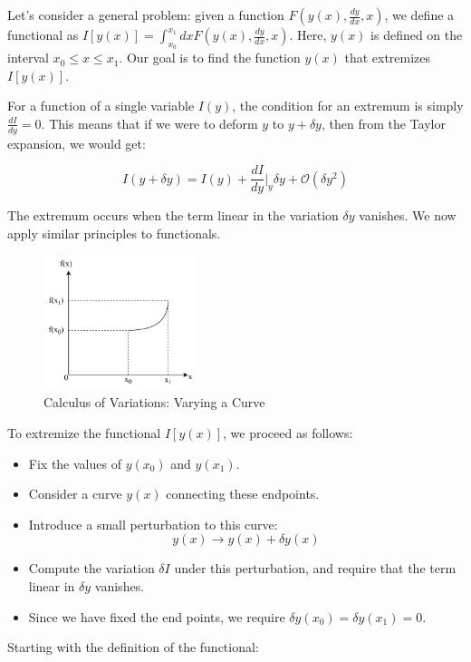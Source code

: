 Let's consider a general problem: given a function $F(y(x), \frac{dy}{dx}, x)$, we define 
a functional as $I[y(x)]=\int_{x_{0}}^{x_{1}} dx F(y(x), \frac{dy}{dx}, x)$. Here, $y(x)$ 
is defined on the interval $x_0 \leq x \leq x_1$. Our goal is to find the function $y(x)$ 
that extremizes $I[y(x)]$.

For a function of a single variable $I(y)$, the condition for an extremum is simply 
$\frac{dI}{dy} = 0$. This means that if we were to deform $y$ to $y + \delta y$, then 
from the Taylor expansion, we would get:

\[
    I(y + \delta y) = I(y) + \frac{dI}{dy}\bigg|_y \delta y + \mathcal{O}(\delta y^2)
\]

The extremum occurs when the term linear in the variation $\delta y$ vanishes. We now 
apply similar principles to functionals.

\begin{figure}[ht]
    \centering
    \includegraphics[width=0.4\textwidth]{images/3-1-1.png}
    \caption{Calculus of Variations: Varying a Curve}
    \label{fig:3-1-1}
\end{figure}

To extremize the functional $I[y(x)]$, we proceed as follows:

\begin{itemize}
    \item Fix the values of $y(x_0)$ and $y(x_1)$.
    \item Consider a curve $y(x)$ connecting these endpoints.
    \item Introduce a small perturbation to this curve:
    \[
        y(x) \rightarrow y(x) + \delta y(x)
    \]
    \item Compute the variation $\delta I$ under this perturbation, and require that the
    term linear in $\delta y$ vanishes.
    \item Since we have fixed the end points, we require $\delta y(x_0) = \delta y(x_1) = 0$.
\end{itemize}

Starting with the definition of the functional:

